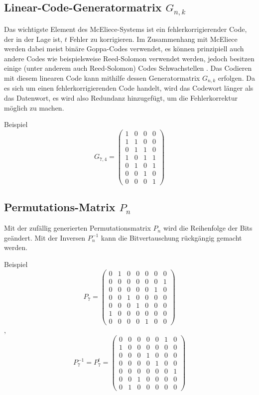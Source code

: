 \subsection{Linear-Code-Generatormatrix $G_{n,k}$
\label{mceliece:subsection:g_nk}}
Das wichtigste Element des McEliece-Systems ist ein fehlerkorrigierender Code,
der in der Lage ist, $t$ Fehler zu korrigieren.
Im Zusammenhang mit McEliece werden dabei meist binäre Goppa-Codes \cite{mceliece:goppa} verwendet,
es können prinzipiell auch andere Codes wie beispielsweise Reed-Solomon verwendet werden,
jedoch besitzen einige (unter anderem auch Reed-Solomon) Codes Schwachstellen \cite{mceliece:lorenz}.
Das Codieren mit diesem linearen Code kann mithilfe dessen Generatormatrix $G_{n,k}$ erfolgen.
Da es sich um einen fehlerkorrigierenden Code handelt,
wird das Codewort länger als das Datenwort,
es wird also Redundanz hinzugefügt,
um die Fehlerkorrektur möglich zu machen.

Beispiel
\[
    G_{7,4}=
    \begin{pmatrix}
        1 & 0 & 0 & 0\\
        1 & 1 & 0 & 0\\
        0 & 1 & 1 & 0\\
        1 & 0 & 1 & 1\\
        0 & 1 & 0 & 1\\
        0 & 0 & 1 & 0\\
        0 & 0 & 0 & 1
    \end{pmatrix}
\]

\subsection{Permutations-Matrix $P_n$
\label{mceliece:subsection:p_n}}
Mit der zufällig generierten Permutationsmatrix $P_n$ wird die Reihenfolge der Bits geändert.
Mit der Inversen $P_n^{-1}$ kann die Bitvertauschung rückgängig gemacht werden.

Beispiel
\[
    P_7=
    \begin{pmatrix}
        0 & 1 & 0 & 0 & 0 & 0 & 0\\
        0 & 0 & 0 & 0 & 0 & 0 & 1\\
        0 & 0 & 0 & 0 & 0 & 1 & 0\\
        0 & 0 & 1 & 0 & 0 & 0 & 0\\
        0 & 0 & 0 & 1 & 0 & 0 & 0\\
        1 & 0 & 0 & 0 & 0 & 0 & 0\\
        0 & 0 & 0 & 0 & 1 & 0 & 0
    \end{pmatrix}
\]
,
\[
    P_7^{-1}=P_7^t=
    \begin{pmatrix}
        0 & 0 & 0 & 0 & 0 & 1 & 0\\
        1 & 0 & 0 & 0 & 0 & 0 & 0\\
        0 & 0 & 0 & 1 & 0 & 0 & 0\\
        0 & 0 & 0 & 0 & 1 & 0 & 0\\
        0 & 0 & 0 & 0 & 0 & 0 & 1\\
        0 & 0 & 1 & 0 & 0 & 0 & 0\\
        0 & 1 & 0 & 0 & 0 & 0 & 0
    \end{pmatrix}
\]

